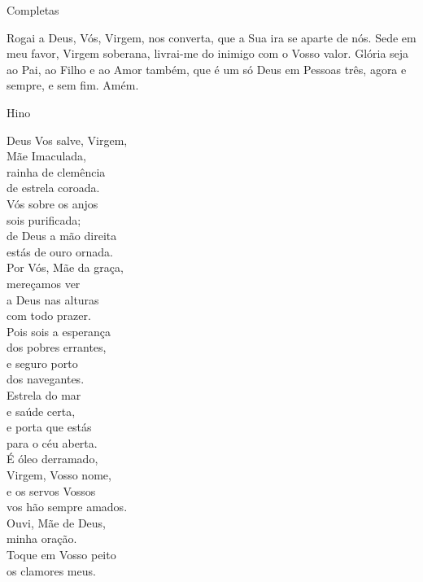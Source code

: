 \newpage
\begin{center}
    Completas
\end{center}
\begin{flushleft}
    Rogai a Deus, Vós, Virgem, nos converta, que a Sua ira se aparte de nós. Sede em meu favor, Virgem soberana, livrai-me do inimigo com o Vosso valor. Glória seja ao Pai, ao Filho e ao Amor também, que é um só Deus em Pessoas três, agora e sempre, e sem fim. Amém.
\end{flushleft}
\begin{center}
    \textcolor{VioletRed3}{Hino}
\end{center}
\begin{multicols}{2}\setlength{\parindent}{0pt}
    Deus Vos salve, Virgem, \\
    Mãe Imaculada, \\
    rainha de clemência \\
    de estrela coroada.
    \vspace{.2cm} \\
    Vós sobre os anjos \\
    sois purificada; \\
    de Deus a mão direita \\
    estás de ouro ornada.
    \vspace{.2cm} \\
    Por Vós, Mãe da graça, \\
    mereçamos ver \\
    a Deus nas alturas \\
    com todo prazer.
    \vspace{.2cm} \\
    Pois sois a esperança \\
    dos pobres errantes, \\
    e seguro porto \\
    dos navegantes.
    \vspace{.2cm} \\
    Estrela do mar \\
    e saúde certa, \\
    e porta que estás \\
    para o céu aberta.
    \vspace{.2cm} \\
    É óleo derramado, \\
    Virgem, Vosso nome, \\
    e os servos Vossos \\
    vos hão sempre amados.
    \vspace{.2cm} \\
    Ouvi, Mãe de Deus, \\
    minha oração. \\
    Toque em Vosso peito \\
    os clamores meus.
\end{multicols}
